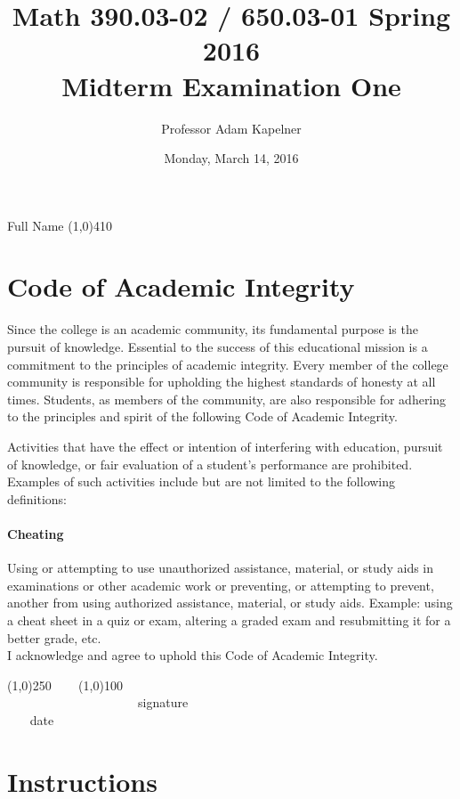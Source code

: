 \documentclass[12pt]{article}
\title{Math 390.03-02 / 650.03-01 Spring 2016 \\ Midterm Examination One}
\author{Professor Adam Kapelner}
\date{Monday, March 14, 2016}
\begin{document}
\maketitle

\noindent Full Name \line(1,0){410}

\thispagestyle{empty}

\section*{Code of Academic Integrity}

\footnotesize
Since the college is an academic community, its fundamental purpose is the pursuit of knowledge. Essential to the success of this educational mission is a commitment to the principles of academic integrity. Every member of the college community is responsible for upholding the highest standards of honesty at all times. Students, as members of the community, are also responsible for adhering to the principles and spirit of the following Code of Academic Integrity.

Activities that have the effect or intention of interfering with education, pursuit of knowledge, or fair evaluation of a student's performance are prohibited. Examples of such activities include but are not limited to the following definitions:

\paragraph{Cheating} Using or attempting to use unauthorized assistance, material, or study aids in examinations or other academic work or preventing, or attempting to prevent, another from using authorized assistance, material, or study aids. Example: using a cheat sheet in a quiz or exam, altering a graded exam and resubmitting it for a better grade, etc.
\\

\noindent I acknowledge and agree to uphold this Code of Academic Integrity. \\

\begin{center}
\line(1,0){250} ~~~ \line(1,0){100}\\
~~~~~~~~~~~~~~~~~~~~~signature~~~~~~~~~~~~~~~~~~~~~~~~~~~~~~~~~~~~~~~~~~~~~ date
\end{center}

\normalsize

\section*{Instructions}
\end{document}
